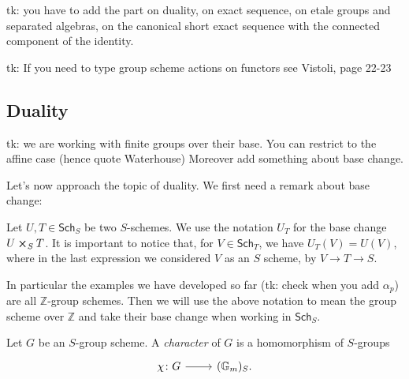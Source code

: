 \documentclass[../Main]{subfiles}
\begin{document}
tk: you have to add the part on duality, on exact sequence, on etale groups and separated algebras,
on the canonical short exact sequence with the connected component of the identity.

tk: If you need to type group scheme actions on functors see Vistoli, page 22-23

\subsection{Duality}
tk: we are working with finite groups over their base.
You can restrict to the affine case (hence quote Waterhouse)
Moreover add something about base change.

Let's now approach the topic of duality.
We first need a remark about base change:


\begin{rem}
	Let $U, T \in \mathsf{Sch}_{ S }$ be two $S$-schemes.
	We use the notation $U_T$ for the base change $U \cross_{ S } T$.
	It is important to notice that, for $V \in \mathsf{Sch}_{ T }$, we 
	have $U_T(V) = U(V)$, where in the last expression
	we considered $V$ as an $S$ scheme, by $V \to T \to S$.

	In particular the examples we have developed so far (tk: check when you add $\alpha_p$)
	are all $\mathbb{Z}$-group schemes.
	Then we will use the above notation to mean the group scheme over $\mathbb{Z}$
	and take their base change when working in $\mathsf{Sch}_{ S }$.
\end{rem}


\begin{defn}
	Let $G$ be an $S$-group scheme.
	A {\em character} of $G$ is a homomorphism of $S$-groups
	\begin{equation*}
	\begin{tikzcd}[row sep = 0ex
		,/tikz/column 1/.append style={anchor=base east}
		,/tikz/column 2/.append style={anchor=base west}]
		\chi\colon G \arrow[r, "", rightarrow] &
		(\mathbb{G}_m)_S
	.\end{tikzcd}
	\end{equation*} 
\end{defn}
\end{document}
